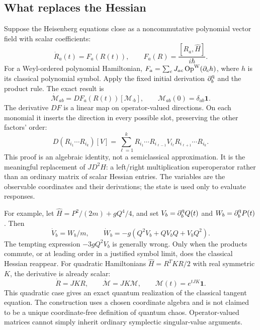 \documentclass[11pt,a4paper]{article}
\newcommand{\Op}{\operatorname{Op}}
\newcommand{\id}{\mathbf{1}}
\begin{document}
\subsection{What replaces the Hessian}
Suppose the Heisenberg equations close as a noncommutative polynomial vector field with scalar coefficients:
\[\dot R_a(t)=F_a(R(t)),\qquad F_a(R)=\frac{[R_a,\widehat H]}{i\hbar}.\]
For a Weyl-ordered polynomial Hamiltonian, $F_a=\sum_cJ_{ac}\Op^{\rm W}(\partial_ch)$, where $h$ is its classical polynomial symbol. Apply the fixed initial derivation $\partial_b^{\rm q}$ and the product rule. The exact result is
\[\boxed{\dot{\mathcal M}_{ab}=DF_a(R(t))[\mathcal M_{\cdot b}],\qquad\mathcal M_{ab}(0)=\delta_{ab}\id.}\]
The derivative $DF$ is a linear map on operator-valued directions. On each monomial it inserts the direction in every possible slot, preserving the other factors' order:
\[D(R_{i_1}\cdots R_{i_k})[V]=\sum_{\ell=1}^kR_{i_1}\cdots R_{i_{\ell-1}}V_{i_\ell}R_{i_{\ell+1}}\cdots R_{i_k}.\]
This proof is an algebraic identity, not a semiclassical approximation. It is the meaningful replacement of $JD^2H$: a left/right multiplication superoperator rather than an ordinary matrix of scalar Hessian entries. The variables are the observable coordinates and their derivations; the state is used only to evaluate responses.

For example, let $\widehat H=P^2/(2m)+gQ^4/4$, and set $V_b=\partial_b^{\rm q}Q(t)$ and $W_b=\partial_b^{\rm q}P(t)$. Then
\[\dot V_b=W_b/m,\qquad\dot W_b=-g(Q^2V_b+QV_bQ+V_bQ^2).\]
The tempting expression $-3gQ^2V_b$ is generally wrong. Only when the products commute, or at leading order in a justified symbol limit, does the classical Hessian reappear. For quadratic Hamiltonians $\widehat H=R^TKR/2$ with real symmetric $K$, the derivative is already scalar:
\[\dot R=JKR,\qquad\dot{\mathcal M}=JK\mathcal M,\qquad\mathcal M(t)=e^{tJK}\id.\]
This quadratic case gives an exact quantum realization of the classical tangent equation. The construction uses a chosen coordinate algebra and is not claimed to be a unique coordinate-free definition of quantum chaos. Operator-valued matrices cannot simply inherit ordinary symplectic singular-value arguments.
\end{document}
